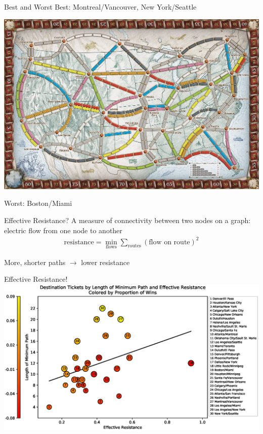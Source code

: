 \documentclass[12pt]{beamer}
\begin{document}
\begin{frame}{Best and Worst}
    Best: Montreal/Vancouver, New York/Seattle
    \begin{center}
    \includegraphics[scale=.25]{figures/board}
    \end{center}
    Worst: Boston/Miami
\end{frame}

\begin{frame}{Effective Resistance?}
    A measure of connectivity between two nodes on a graph:
    electric flow from one node to another
    \begin{align}
        \text{resistance} =
        \min_{\text{flows}}
        \sum_{\text{routes}}
        (\text{flow on route})^2
        \nonumber
    \end{align}
    
    More, shorter paths $\rightarrow$ lower resistance

\end{frame}

\begin{frame}{Effective Resistance!}
    \centering
    \includegraphics[scale=.45]{figures/resistance_aggregate}
\end{frame}
\end{document}
